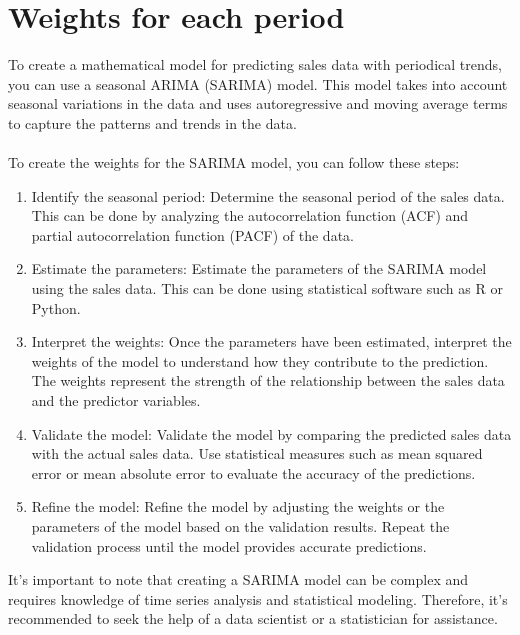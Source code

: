     \section{Weights for each period} \label{sec:weights}
    To create a mathematical model for predicting sales data with periodical trends, you can use a seasonal ARIMA (SARIMA) model.
    This model takes into account seasonal variations in the data and uses autoregressive and moving average terms to capture the
    patterns and trends in the data.\\
    \\
    To create the weights for the SARIMA model, you can follow these steps:
    \begin{enumerate}
        \item Identify the seasonal period: Determine the seasonal period of the sales data. This can be done by analyzing the autocorrelation
        function (ACF) and partial autocorrelation function (PACF) of the data.
        \item Estimate the parameters: Estimate the parameters of the SARIMA model using the sales data. This can be done using statistical
        software such as R or Python.
        \item Interpret the weights: Once the parameters have been estimated, interpret the weights of the model to understand how they
        contribute to the prediction. The weights represent the strength of the relationship between the sales data and the predictor variables.
        \item Validate the model: Validate the model by comparing the predicted sales data with the actual sales data.
        Use statistical measures such as mean squared error or mean absolute error to evaluate the accuracy of the predictions.
        \item Refine the model: Refine the model by adjusting the weights or the parameters of the model based on the validation results.
        Repeat the validation process until the model provides accurate predictions.
    \end{enumerate}
    It's important to note that creating a SARIMA model can be complex and requires knowledge of time series analysis and statistical modeling.
    Therefore, it's recommended to seek the help of a data scientist or a statistician for assistance.
